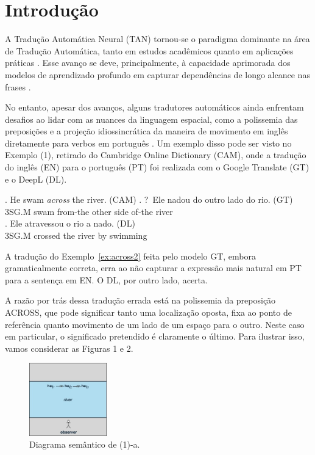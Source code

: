 \documentclass[a4paper, twocolumn, 11pt, twoside]{article}
\begin{document}
\section{Introdução}

A Tradução Automática Neural (TAN) tornou-se o paradigma dominante na área de Tradução Automática, tanto em estudos acadêmicos quanto em aplicações práticas \citep{dabre2020survey}. Esse avanço se deve, principalmente, à capacidade aprimorada dos modelos de aprendizado profundo em capturar dependências de longo alcance nas frases \citep{vaswani2017attention, yang2020survey}.

No entanto, apesar dos avanços, alguns tradutores automáticos ainda enfrentam desafios ao lidar com as nuances da linguagem espacial, como a polissemia das preposições e a projeção idiossincrática da maneira de movimento em inglês diretamente para verbos em português \citep{McCleary-Viotti-2004}. Um exemplo disso pode ser visto no Exemplo (1), retirado do Cambridge Online Dictionary (CAM), onde a tradução do inglês (EN) para o português (PT) foi realizada com o Google Translate (GT) e o DeepL (DL).

\footnotesize
  \ex. He swam \emph{across} the river. (CAM)\label{ex:across2}
  \ag. ?~Ele nadou do outro lado do rio. (GT) \\  
  3SG.M swam from-the other side of-the river\\ 
  \bg. Ele atravessou o rio a nado. (DL) \\ 
  3SG.M crossed the river by swimming\\
  \par
\normalsize
  
A tradução do Exemplo~\ref{ex:across2} feita pelo modelo GT, embora gramaticalmente correta, erra ao não capturar a expressão mais natural em PT para a sentença em EN. O DL, por outro lado, acerta.
  
A razão por trás dessa tradução errada está na polissemia da preposição ACROSS, que pode significar tanto uma localização oposta, fixa ao ponto de referência quanto movimento de um lado de um espaço para o outro. Neste caso em particular, o significado pretendido é claramente o último. Para ilustrar isso, vamos considerar as Figuras 1 e 2.

\begin{figure}[ht]
  \centering
  \includegraphics[width=0.3\textwidth]{aa-a-2.jpg}
  \caption{Diagrama semântico de (1)-a.}\label{fig:across-1a}
\end{figure}
\end{document}
